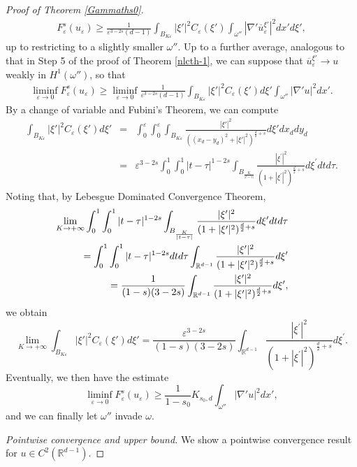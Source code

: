 \documentclass[10pt,a4paper]{amsart}
\def\e{\varepsilon}
\begin{document}
\begin{proof}[Proof of Theorem \rm\ref{Gammaths0}]
\begin{eqnarray}\label{corpo}
F^s_\e(u_\e)\ge\frac{1}{\e^{3-2s}(d-1)}\int_{B_{K\e}}|\xi'|^2 C_\e(\xi') \int_{\omega''}
|\nabla'\overline u_\e^{\xi'}|^2 dx' d\xi',
\end{eqnarray}
up to restricting to a slightly smaller $\omega''$. Up to a further average, analogous to that in Step 5 of the proof of Theorem \ref{nlcth-1}, we can suppose that $\overline u_\e^{\xi'}\to u$ weakly in $H^1(\omega'')$, 
so that 
\begin{eqnarray}\label{newest-2}
\liminf_{\e\to 0}F^s_\e(u_\e)\ge\liminf_{\e\to 0}\frac{1}{\e^{3-2s}(d-1)}\int_{B_{K\e}}|\xi'|^2 C_\e(\xi') d\xi'
\int_{\omega''} |\nabla' u|^2 dx' .
\end{eqnarray}
By a change of variable and Fubini's Theorem, we can compute
\begin{eqnarray*}
\int_{B_{K\e}}|\xi'|^2 C_\e(\xi') d\xi'
&=&\int_0^\e\int_0^\e\int_{B_{K\e}}\frac{|\xi'|^2}{((x_d-y_d)^2+|\xi'|^2)^{\frac d2+s}}d\xi'dx_d dy_d
\\
&=&\e^{3-2s}\int_0^1\int_0^1|t-\tau|^{1-2s}\int_{B_{\frac{K}{|t-\tau|}}}\frac{|\xi^\prime|^2}{(1+|\xi^\prime|^2)^{\frac d2+s}}d\xi^\prime dt d\tau. 
\end{eqnarray*}
Noting that, by Lebesgue Dominated Convergence Theorem,  
\begin{eqnarray*}
&&\hskip-1cm\lim_{K\to+\infty}\int_0^1\int_0^1|t-\tau|^{1-2s}\int_{B_{\frac{K}{|t-\tau|}}}\frac{|\xi^\prime|^2}{(1+|\xi^\prime|^2)^{\frac d2+s}}d\xi^\prime dt d\tau\\
&&=\int_0^1\int_0^1|t-\tau|^{1-2s} dt d\tau\int_{\mathbb R^{d-1}}\frac{|\xi^\prime|^2}{(1+|\xi^\prime|^2)^{\frac d2+s}}d\xi^\prime \\
&&=
\frac1{(1-s)(3-2s)}\int_{\mathbb R^{d-1}}\frac{|\xi^\prime|^2}{(1+|\xi^\prime|^2)^{\frac d2+s}}d\xi^\prime, 
\end{eqnarray*}
we obtain
\begin{equation}\label{limK}
\lim_{K\to+\infty} \int_{B_{K\e}}|\xi'|^2 C_\e(\xi') d\xi'
=\frac{\e^{3-2s}}{(1-s)(3-2s)}\int_{\mathbb R^{d-1}}\frac{|\xi^\prime|^2}{(1+|\xi^\prime|^2)^{\frac d2+s}}d\xi^\prime. 
\end{equation}
Eventually, we then have the estimate 
$$
\liminf_{\e\to 0}F^s_\e(u_\e)\ge \frac{1}{1-s_0}K_{s_0,d}\int_{\omega''} |\nabla' u|^2 dx',
$$
and we can finally let $\omega''$ invade $\omega$. 
\smallskip

{\em Pointwise convergence and upper bound.}
We show a pointwise convergence result for $u\in C^2(\mathbb R^{d-1})$. 


\end{proof}
\end{document}
